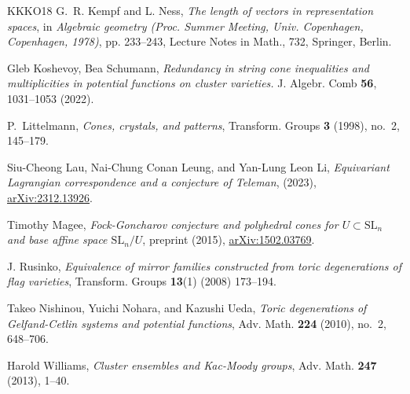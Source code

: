 \documentclass[11pt]{amsart}
\theoremstyle{plain}
\theoremstyle{definition}
\theoremstyle{remark}
\numberwithin{equation}{section} \numberwithin{table}{section}
\numberwithin{equation}{section}
\begin{document}
\begin{thebibliography}{KKKO18}
G.~R. Kempf and L. Ness, \emph{The length of vectors in representation spaces}, in {\it Algebraic geometry (Proc. Summer Meeting, Univ. Copenhagen, Copenhagen, 1978)}, pp. 233--243, Lecture Notes in Math., 732, Springer, Berlin.

Gleb Koshevoy, Bea Schumann, \emph{Redundancy in string cone inequalities and multiplicities in potential functions on cluster varieties.} J. Algebr. Comb \textbf{56}, 1031--1053 (2022).

P.~Littelmann, \emph{Cones, crystals, and patterns}, Transform. Groups
  \textbf{3} (1998), no.~2, 145--179. 
  
Siu-Cheong Lau, Nai-Chung Conan Leung, and Yan-Lung Leon Li, \emph{Equivariant Lagrangian correspondence and a conjecture of Teleman}, (2023), \href{https://arxiv.org/abs/2312.13926}{arXiv:2312.13926}.

Timothy Magee, \emph{Fock-Goncharov conjecture and polyhedral cones for $U \subset \mathrm{SL}_n$ and base affine space $\mathrm{SL}_n/U$}, preprint (2015), \href{https://arxiv.org/abs/1502.03769}{arXiv:1502.03769}.

J. Rusinko, \emph{Equivalence of mirror families constructed from toric degenerations of
flag varieties}, Transform. Groups \textbf{13}(1) (2008) 173--194.

Takeo Nishinou, Yuichi Nohara, and Kazushi Ueda, \emph{Toric degenerations of
  {G}elfand-{C}etlin systems and potential functions}, Adv. Math. \textbf{224}
  (2010), no.~2, 648--706. 

Harold Williams, \emph{Cluster ensembles and {K}ac-{M}oody groups}, Adv. Math.
  \textbf{247} (2013), 1--40. 

\end{thebibliography}
\end{document}
